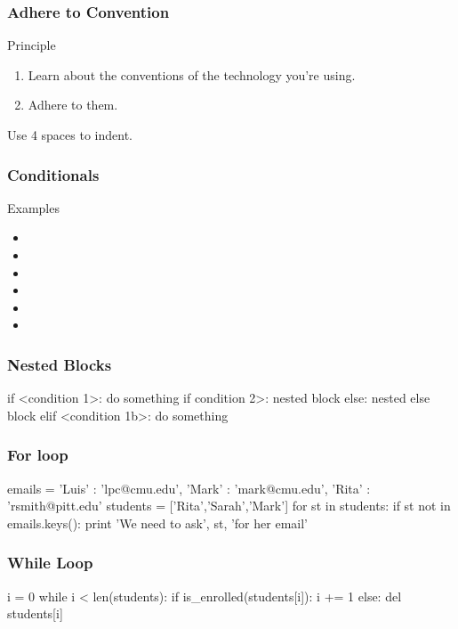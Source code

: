 \begin{frame}[fragile]
\frametitle{Adhere to Convention}
\begin{block}{Principle}
\begin{enumerate}
\item Learn about the conventions of the technology you're using.
\item Adhere to them.
\end{enumerate}
\end{block}

Use 4 spaces to indent.
\end{frame}

\begin{frame}[fragile]
\frametitle{Conditionals}


\begin{block}{Examples}
\begin{itemize}
\item {}
\item {}
\item {}
\item {}
\item {}
\item {}
\end{itemize}
\end{block}

\end{frame}

\begin{frame}[fragile]
\frametitle{Nested Blocks}

\begin{python}
if <condition 1>:
    do something
    if condition 2>:
        nested block
    else:
        nested else block
elif <condition 1b>:
    do something
\end{python}
\end{frame}

\begin{frame}[fragile]
\frametitle{For loop}

\begin{python}
emails = { 'Luis' : 'lpc@cmu.edu',
           'Mark' : 'mark@cmu.edu',
           'Rita' : 'rsmith@pitt.edu' }
students = ['Rita','Sarah','Mark']
for st in students:
    if st not in emails.keys():
        print 'We need to ask', st, 'for her email'
\end{python}
\end{frame}

\begin{frame}[fragile]
\frametitle{While Loop}

\begin{python}
i = 0
while i < len(students):
    if is_enrolled(students[i]):
        i += 1
    else:
        del students[i]
\end{python}
\end{frame}

